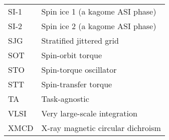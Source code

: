 {\begin{longtable}[l]{ll}
        SI-1  & Spin ice 1 (a kagome ASI phase)             \\
        SI-2  & Spin ice 2 (a kagome ASI phase)             \\
        SJG   & Stratified jittered grid                    \\
        SOT   & Spin-orbit torque                           \\
        STO   & Spin-torque oscillator                      \\
        STT   & Spin-transfer torque                        \\
        TA    & Task-agnostic                               \\
        VLSI  & Very large-scale integration                \\
        XMCD  & X-ray magnetic circular dichroism           \\
    \end{longtable}
}
